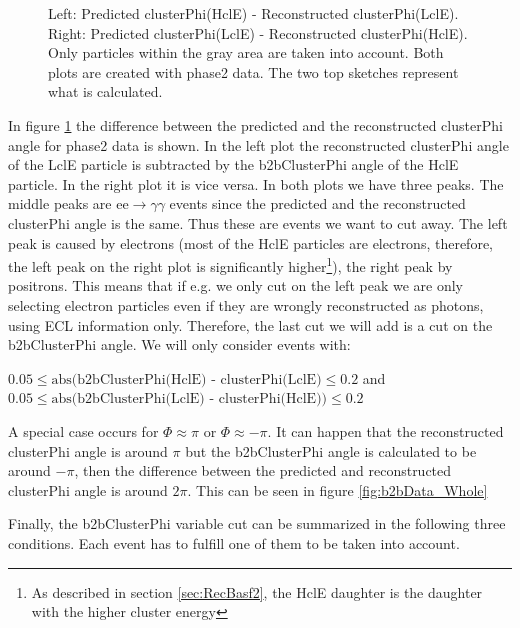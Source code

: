 \documentclass[a4paper,11pt,twosided,final,german,openbib,pdftex,listof=totoc,bibliography=totoc]{scrbook}
\begin{document}
\begin{figure}[h!]
\begin{minipage}[b]{\textwidth}
	\caption[b2bClusterPhi - clusterPhi For Beamtime-Data]{Left: Predicted clusterPhi(HclE) - Reconstructed clusterPhi(LclE). Right: Predicted clusterPhi(LclE) - Reconstructed clusterPhi(HclE). Only particles within the gray area are taken into account. Both plots are created with phase2 data. The two top sketches represent what is calculated.}
	\label{fig:b2bData}

\end{minipage}
\end{figure}


In figure \ref{fig:b2bData} the difference between the predicted and the reconstructed clusterPhi angle for phase2 data is shown. In the left plot the reconstructed clusterPhi angle of the LclE particle is subtracted by the b2bClusterPhi angle of the HclE particle. In the right plot it is vice versa. In both plots we have three peaks. The middle peaks are $\textrm{ee} \rightarrow \gamma \gamma$ events since the predicted and the reconstructed clusterPhi angle is the same. Thus these are events we want to cut away. The left peak is caused by electrons (most of the HclE particles are electrons, therefore, the left peak on the right plot is significantly higher\footnote{As described in section \ref{sec:RecBasf2}, the HclE daughter is the daughter with the higher cluster energy}), the right peak by positrons. This means that if e.g. we only cut on the left peak we are only selecting electron particles even if they are wrongly reconstructed as photons, using ECL information only. 
Therefore, the last cut we will add is a cut on the b2bClusterPhi angle. We will only consider events with:
\newline

 $0.05 \leq \textrm{abs(b2bClusterPhi(HclE) - clusterPhi(LclE)} \leq 0.2 $ and  $0.05 \leq \textrm{abs(b2bClusterPhi(LclE) - clusterPhi(HclE))} \leq 0.2$
\newline


A special case occurs for $\Phi \approx \pi$ or $\Phi \approx -\pi$. It can happen that the reconstructed clusterPhi angle is around $\pi$ but the b2bClusterPhi angle is calculated to be around $-\pi$, then the difference between the predicted and reconstructed clusterPhi angle is around $2\pi$. This can be seen in figure \ref{fig:b2bData_Whole}

Finally, the b2bClusterPhi variable cut can be summarized in the following three conditions. Each event has to fulfill one of them to be taken into account.
\end{document}
